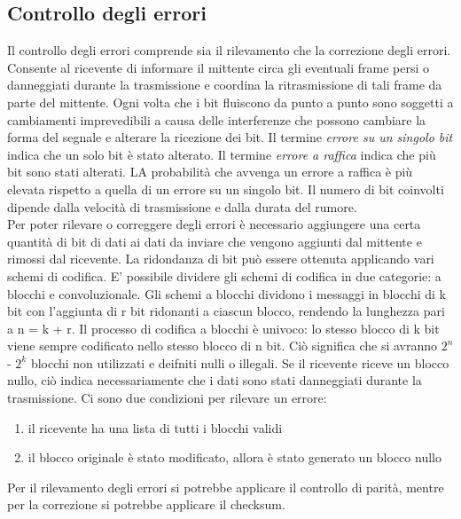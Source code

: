 \documentclass[12pt]{report}
\begin{document}
\subsection{Controllo degli errori}
Il controllo degli errori comprende sia il rilevamento che la correzione degli errori. Consente al ricevente di informare il mittente circa gli eventuali frame persi o danneggiati durante la trasmissione e coordina la ritrasmissione di tali frame da parte del mittente. Ogni volta che i bit fluiscono da punto a punto sono soggetti a cambiamenti imprevedibili a causa delle interferenze che possono cambiare la forma del segnale e alterare la ricezione dei bit. Il termine \textit{errore su un singolo bit} indica che un solo bit è stato alterato. Il termine \textit{errore a raffica} indica che più bit sono stati alterati. LA probabilità che avvenga un errore a raffica è più elevata rispetto a quella di un errore su un singolo bit. Il numero di bit coinvolti dipende dalla velocità di trasmissione e dalla durata del rumore.
\vspace{\baselineskip}\\
Per poter rilevare o correggere degli errori è necessario aggiungere una certa quantità di bit di dati ai dati da inviare che vengono aggiunti dal mittente e rimossi dal ricevente. La ridondanza di bit può essere ottenuta applicando vari schemi di codifica. E' possibile dividere gli schemi di codifica in due categorie: a blocchi e convoluzionale. Gli schemi a blocchi dividono i messaggi in blocchi di k bit con l'aggiunta di r bit ridonanti a ciascun blocco, rendendo la lunghezza pari a n = k + r. Il processo di codifica a blocchi è univoco: lo stesso blocco di k bit viene sempre codificato nello stesso blocco di n bit.  Ciò significa che si avranno $2^n$ - $2^k$ blocchi non utilizzati e deifniti nulli o illegali. Se il ricevente riceve un blocco nullo, ciò indica necessariamente che i dati sono stati danneggiati durante la trasmissione. Ci sono due condizioni per rilevare un errore:
\begin{enumerate}
	\item il ricevente ha una lista di tutti i blocchi validi
	\item il blocco originale è stato modificato, allora è stato generato un blocco nullo
\end{enumerate}
Per il rilevamento degli errori si potrebbe applicare il controllo di parità, mentre per la correzione si potrebbe applicare il checksum.
\end{document}
